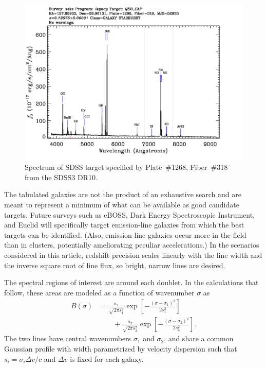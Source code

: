 \documentclass[preprint2, 10pt]{aastex}
\begin{document}
\begin{figure}[t]
   \centering
    \includegraphics[width=\columnwidth]{SpecById.pdf} 
   \caption{Spectrum of SDSS target specified by Plate~\#1268, Fiber~\#318 from the SDSS3 DR10.  \label{shsinput:fig}}
\end{figure}


The tabulated galaxies are not the product of an exhaustive search and are meant to represent a minimum of what can be available
as good
candidate targets.
Future surveys such as eBOSS, Dark Energy Spectroscopic Instrument, and Euclid will specifically target emission-line
galaxies from which the best targets can be identified. (Also, emission line galaxies occur more in the field than in clusters, potentially ameliorating peculiar accelerations.)  In the scenarios considered in this article, redshift precision scales
linearly with the 
line width and the inverse square root of line flux, so bright, narrow lines 
are desired. 



The spectral regions of interest
are around each doublet.  In the calculations that follow, these areas are modeled as a function of wavenumber $\sigma$ as
\begin{align}
B(\sigma)& =\frac{a_1}{\sqrt{2\pi s_1^2}}\exp{\left[-\frac{\left(\sigma-\sigma_1\right)^2}{2s_1^2}\right]} \nonumber\\
 &\qquad +\frac{a_2}{\sqrt{2\pi s_2^2}}\exp{\left[-\frac{\left(\sigma-\sigma_2\right)^2}{2s_2^2}\right]}.
\label{input:eqn}
\end{align}
The two lines have central wavenumbers $\sigma_1$ and $\sigma_2$, and share a common Gaussian profile with width parametrized by velocity dispersion
such that $s_i=\sigma_i\Delta v/c$ and $\Delta v$ is fixed for each galaxy. 
\end{document}
